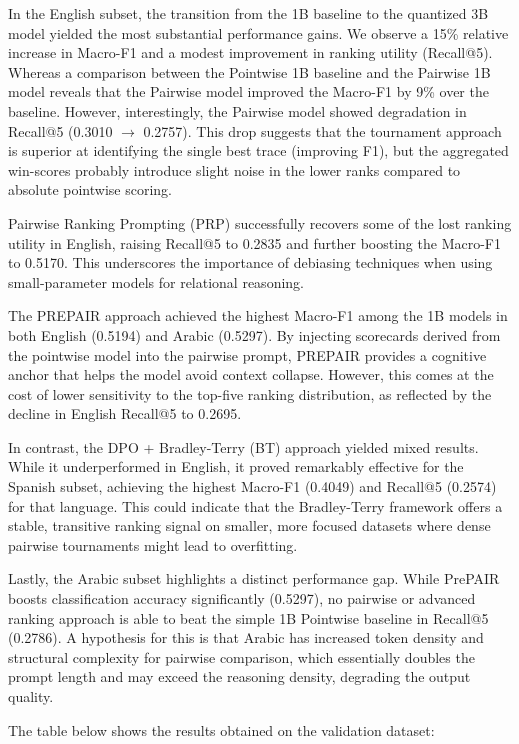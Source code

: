 \documentclass[
]{ceurart}
\begin{document}
In the English subset, the transition from the 1B baseline to the quantized 3B model yielded the most substantial performance gains. We observe a 15\% relative increase in Macro-F1 and a modest improvement in ranking utility (Recall@5). Whereas a comparison between the Pointwise 1B baseline and the Pairwise 1B model reveals that the Pairwise model improved the Macro-F1 by 9\% over the baseline.  However, interestingly, the Pairwise model showed degradation in Recall@5 (0.3010 $\to$ 0.2757). This drop suggests that the tournament approach is superior at identifying the single best trace (improving F1), but the aggregated win-scores probably introduce slight noise in the lower ranks compared to absolute pointwise scoring.

Pairwise Ranking Prompting (PRP) successfully recovers some of the lost ranking utility in English, raising Recall@5 to 0.2835 and further boosting the Macro-F1 to 0.5170. This underscores the importance of debiasing techniques when using small-parameter models for relational reasoning.

The PREPAIR approach achieved the highest Macro-F1 among the 1B models in both English (0.5194) and Arabic (0.5297). By injecting scorecards derived from the pointwise model into the pairwise prompt, PREPAIR provides a cognitive anchor that helps the model avoid context collapse. However, this comes at the cost of lower sensitivity to the top-five ranking distribution, as reflected by the decline in English Recall@5 to 0.2695.

In contrast, the DPO + Bradley-Terry (BT) approach yielded mixed results. While it underperformed in English, it proved remarkably effective for the Spanish subset, achieving the highest Macro-F1 (0.4049) and Recall@5 (0.2574) for that language. This could indicate that the Bradley-Terry framework offers a stable, transitive ranking signal on smaller, more focused datasets where dense pairwise tournaments might lead to overfitting.

Lastly, the Arabic subset highlights a distinct performance gap. While PrePAIR boosts classification accuracy significantly (0.5297), no pairwise or advanced ranking approach is able to beat the simple 1B Pointwise baseline in Recall@5 (0.2786). A hypothesis for this is that Arabic has increased token density and structural complexity for pairwise comparison, which essentially doubles the prompt length and may exceed the reasoning density, degrading the output quality.

The table below shows the results obtained on the validation dataset:
\end{document}
